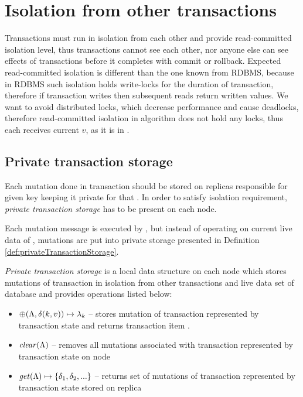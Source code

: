 
\section{Isolation from other transactions}
Transactions must run in isolation from each other and provide read-committed isolation level, thus transactions cannot see each other, nor anyone else can see effects of transactions before it completes with commit or rollback. Expected read-committed isolation is different than the one known from RDBMS, because in RDBMS such isolation holds write-locks for the duration of transaction, therefore if transaction writes then subsequent reads return written values. We want to avoid distributed locks, which decrease performance and cause deadlocks, therefore read-committed isolation in \mpt algorithm does not hold any locks, thus each \selectMessage receives current $v$, as it is in \database.

\subsection{Private transaction storage}
\label{sec:mpp:privateTxStorage}
Each mutation  done in transaction \transaction should be stored on replicas responsible for given key keeping it private for that \transaction. In order to satisfy isolation requirement, \emph{private transaction storage} has to be present on each node.

Each mutation message is executed by , but instead of operating on current live data of \database, mutations \mutations are put into private storage presented in Definition \ref{def:privateTransactionStorage}. 

\begin{definition}
\label{def:privateTransactionStorage}
\emph{Private transaction storage} \txStorage is a local data structure on each node  which stores mutations \mutations of transaction \transaction in isolation from other transactions \transactions and live data set of database \database and provides operations listed below: 
  \begin{itemize}
    \item $\oplus(\text{$\Lambda$}, \text{$\delta(k, v)$}) \mapsto \text{$\lambda_{k}$}$ -- stores mutation  of transaction \transactionj represented by transaction state \txState and returns transaction item . 
    \item $\mathit{clear}(\text{$\Lambda$})$ -- removes all mutations \mutations associated with transaction \transactionj represented by transaction state \txState on node 
    \item $\mathit{get}(\text{$\Lambda$}) \mapsto \text{$\{\delta_{1}, \delta_{2}, ...\}$}$ -- returns set of mutations of transaction \transactionj represented by transaction state \txState stored on replica  
  \end{itemize}
\end{definition}

